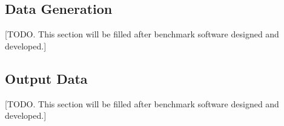 \subsection{Data Generation}
[TODO. This section will be filled after benchmark software designed and developed.]

\subsection{Output Data}
[TODO. This section will be filled after benchmark software designed and developed.]\